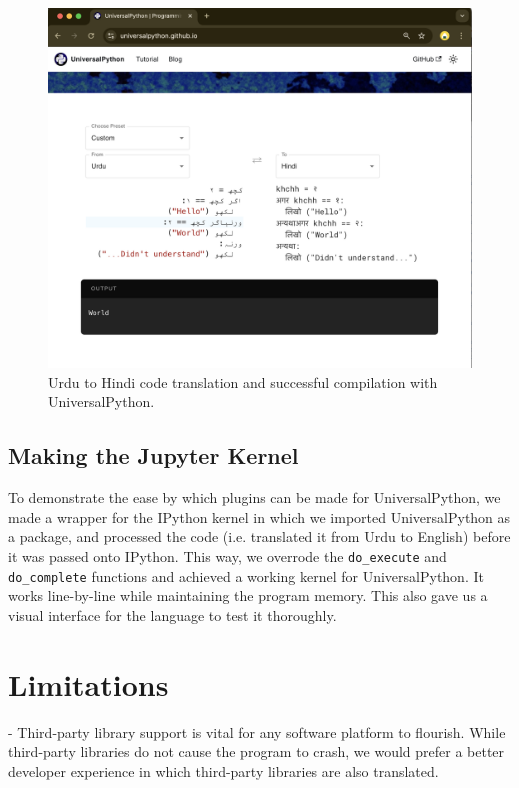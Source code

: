 \documentclass[conference]{IEEEtran}
\begin{document}
\begin{figure}[htbp]
\centerline{\includegraphics[width=\columnwidth]{UniversalPython-language-to-language.png}}
\caption{Urdu to Hindi code translation and successful compilation with UniversalPython.}
\label{language-to-language}
\end{figure}

\subsection{Making the Jupyter Kernel}

To demonstrate the ease by which plugins can be made for UniversalPython, we made a wrapper for the IPython kernel in which we imported UniversalPython as a package, and processed the code (i.e. translated it from Urdu to English) before it was passed onto IPython. This way, we overrode the \verb|do_execute| and \verb|do_complete| functions and achieved a working kernel for UniversalPython. It works line-by-line while maintaining the program memory. This also gave us a visual interface for the language to test it thoroughly.

\section{Limitations}

- Third-party library support is vital for any software platform to flourish. While third-party libraries do not cause the program to crash, we would prefer a better developer experience in which third-party libraries are also translated.
\end{document}
